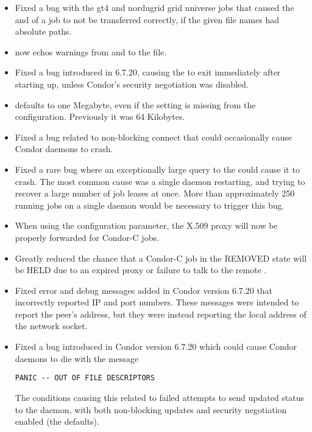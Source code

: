 \begin{itemize}
\item Fixed a bug with the gt4 and nordugrid grid universe jobs that
caused the  and  of a job to not be 
transferred correctly, if the given file names had absolute paths.

\item {} now echos warnings from  and
 to the  file.

\item Fixed a bug introduced in 6.7.20, causing the 
to exit immediately after starting up, unless Condor's security
negotiation was disabled.

\item {} defaults to one Megabyte, even if the
setting is missing from the configuration.  Previously it was 64 Kilobytes.

\item Fixed a bug related to non-blocking connect that could occasionally
cause Condor daemons to crash.

\item Fixed a rare bug where an exceptionally large query to the
 could cause it to crash.  The most common cause was a single
 daemon restarting,
and trying to recover a large number of job leases at once.
More than approximately 250 running jobs on a single  daemon
would be necessary to trigger this bug.

\item When using the  configuration
parameter, the X.509 proxy will now be properly forwarded for Condor-C jobs.

\item Greatly reduced the chance that a Condor-C job in the REMOVED state
will be HELD due to an expired proxy or failure to talk to the remote
.

\item Fixed error and debug messages added in Condor version 6.7.20 that
incorrectly reported IP and port numbers.  These messages were
intended to report the peer's address, but they were instead reporting the
local address of the network socket.

\item Fixed a bug introduced in Condor version 6.7.20
which could cause Condor daemons to
die with the message 
\begin{verbatim}
PANIC -- OUT OF FILE DESCRIPTORS
\end{verbatim}
The conditions
causing this related to failed attempts to send updated status
to the  daemon,
with both non-blocking updates and security negotiation
enabled (the defaults).


\end{itemize}
